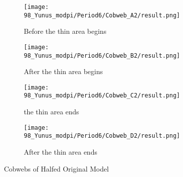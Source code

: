 \begin{figure}
    \centering
    \begin{subfigure}{0.4\textwidth}
        \centering
        \texttt{[image: 98\_Yunus\_modpi/Period6/Cobweb\_A2/result.png]}
        \caption{Before the thin area begins}
        \label{fig:yunus.pi.CobwebA2}
    \end{subfigure}
    \begin{subfigure}{0.4\textwidth}
        \centering
        \texttt{[image: 98\_Yunus\_modpi/Period6/Cobweb\_B2/result.png]}
        \caption{After the thin area begins}
        \label{fig:yunus.pi.CobwebB2}
    \end{subfigure}
    \begin{subfigure}{0.4\textwidth}
        \centering
        \texttt{[image: 98\_Yunus\_modpi/Period6/Cobweb\_C2/result.png]}
        \caption{the thin area ends}
        \label{fig:yunus.pi.CobwebC2}
    \end{subfigure}
    \begin{subfigure}{0.4\textwidth}
        \centering
        \texttt{[image: 98\_Yunus\_modpi/Period6/Cobweb\_D2/result.png]}
        \caption{After the thin area ends}
        \label{fig:yunus.pi.CobwebD2}
    \end{subfigure}
    \caption{Cobwebs of Halfed Original Model}
\end{figure}
